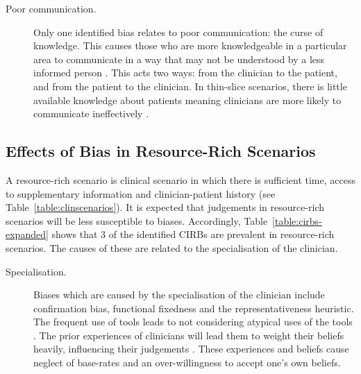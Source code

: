 \documentclass[a4paper]{scrartcl}     %
\newcommand{\ignore}[1]{}
\begin{document}
\begin{description}
    \item[Poor communication.]
    Only one identified bias relates to poor communication: the curse of knowledge. This causes those who are more knowledgeable in a particular area to communicate in a way that may not be understood by a less informed person \citep{ColinCamerer1989}. This acts two ways: from the clinician to the patient, and from the patient to the clinician. In thin-slice scenarios, there is little available knowledge about patients meaning clinicians are more likely to communicate ineffectively \citep{Kennedy1995}.
    \end{description}

  \subsection{Effects of Bias in Resource-Rich Scenarios}

    A resource-rich scenario is clinical scenario in which there is sufficient time, access to supplementary information and clinician-patient history (see Table~\ref{table:clinscenarios}). It is expected that judgements in resource-rich scenarios will be less susceptible to biases. Accordingly, Table~\ref{table:cirbs-expanded} shows that 3 of the identified CIRBs are prevalent in resource-rich scenarios. The causes of these are related to the specialisation of the clinician.


    \begin{description}
    \item[Specialisation.]
    Biases which are caused by the specialisation of the clinician include confirmation bias,\ignore{observer-expectancy effect, ascertainment bias} functional fixedness and the representativeness heuristic\ignore{extension neglect and base rate neglect}. The frequent use of tools leads to not considering atypical uses of the tools \citep{Adamson1952}. The prior experiences of clinicians will lead them to weight their beliefs heavily, influencing their judgements \citet{Wason1960}. These experiences and beliefs cause neglect of base-rates and an over-willingness to accept one's own beliefs.
    \end{description}
\end{document}
